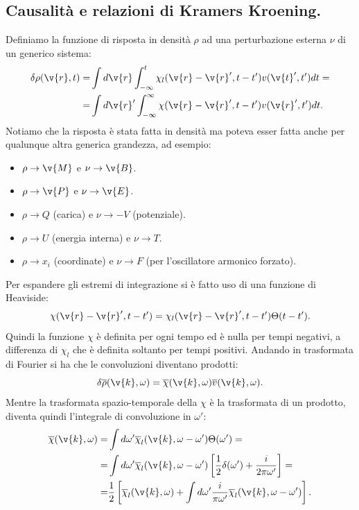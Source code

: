 \subsection{Causalità e relazioni di Kramers Kroening.}%
\label{sub:Funzione di risposta e teorema di fluttuazione dissipazione.}
Definiamo la funzione di risposta in densità $\rho$ ad una perturbazione esterna $\nu$ di un generico sistema:
\[\begin{aligned}
    \delta\rho (\v{r}, t) =&
    \int d\v{r}\int_{-\infty}^{t}\chi_l(\v{r}-\v{r}',t-t')v(\v{t}',t')dt=\\ 
    =&
    \int d\v{r}'\int_{-\infty}^{\infty}\chi(\v{r}-\v{r}', t-t') v(\v{r}',t')dt
.\end{aligned}\]
Notiamo che la risposta è stata fatta in densità ma poteva esser fatta anche per qualunque altra generica grandezza, ad esempio:
\begin{itemize}
    \item $\rho\to \v{M}$ e $\nu  \to \v{B}$.
    \item $\rho\to \v{P}$ e $\nu\to \v{E}$.
    \item $\rho\to Q$ (carica) e $\nu\to -V$ (potenziale).
    \item $\rho\to U$ (energia interna) e $\nu\to T$.
    \item $\rho\to x_i$ (coordinate) e $\nu\to F$ (per l'oscillatore armonico forzato).
\end{itemize}
Per espandere gli estremi di integrazione si è fatto uso di una funzione di Heaviside:
\[
    \chi(\v{r}-\v{r}', t-t') =\chi_l(\v{r}-\v{r}',t-t')\Theta (t-t') 
.\] 
Quindi la funzione $\chi$ è definita per ogni tempo ed è nulla per tempi negativi, a differenza di $\chi_l$ che è definita soltanto per tempi positivi. Andando in trasformata di Fourier si ha che le convoluzioni diventano prodotti:
\[
    \delta\overline{\rho}(\v{k},\omega) 
    = \overline{\chi}(\v{k},\omega) \overline{v}(\v{k},\omega) 
.\] 
Mentre la trasformata spazio-temporale della $\chi$ è la trasformata di un prodotto, diventa quindi l'integrale di convoluzione in $\omega'$:
\[\begin{aligned}
    \overline{\chi}(\v{k},\omega) =&
    	\int d\omega' \overline{\chi}_l(\v{k},\omega-\omega')\Theta (\omega')=\\
    =&
	\int d\omega' \overline{\chi}_l(\v{k},\omega-\omega')
	\left[\frac{1}{2}\delta (\omega') + \frac{i}{2\pi\omega'}\right]=\\
    =&
    	\frac{1}{2}\left[\overline{\chi}_l(\v{k},\omega) + 
    	\int d\omega' \frac{i}{\pi\omega'} 
	\overline{\chi}_l(\v{k},\omega-\omega') \right]
.\end{aligned}\]
